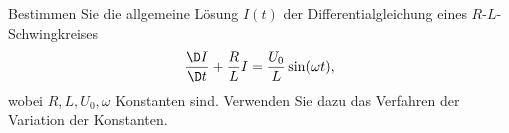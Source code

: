 \begin{atiTask}[
  title = Variation der Konstanten
]
	Bestimmen Sie die allgemeine Lösung $I(t)$ der Differentialgleichung eines $R$-$L$-Schwingkreises
	\begin{equation*}
	\frac{\D I}{\D t}+\frac{R}{L}I=\frac{U_0}{L}\sin (\omega t),
	\end{equation*}
	wobei $R, L, U_0, \omega$ Konstanten sind. Verwenden Sie dazu das Verfahren der Variation der Konstanten.
	
	 \end{atiTask}
